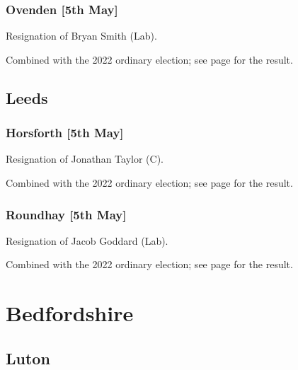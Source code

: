 \documentclass[a4paper,openany]{book}
\begin{document}
\begin{resultsiii}
\subsubsection*{Ovenden \hspace*{\fill}\nolinebreak[1]%
	\enspace\hspace*{\fill}
	[5th May]}


Resignation of Bryan Smith (Lab).

Combined with the 2022 ordinary election; see page \pageref{CalderdaleOvenden} for the result.

\subsection*{Leeds}

\subsubsection*{Horsforth \hspace*{\fill}\nolinebreak[1]%
	\enspace\hspace*{\fill}
	[5th May]}


Resignation of Jonathan Taylor (C).

Combined with the 2022 ordinary election; see page \pageref{LeedsHorsforth} for the result.

\subsubsection*{Roundhay \hspace*{\fill}\nolinebreak[1]%
	\enspace\hspace*{\fill}
	[5th May]}


Resignation of Jacob Goddard (Lab).

Combined with the 2022 ordinary election; see page \pageref{LeedsRoundhay} for the result.

\section{Bedfordshire}

\subsection*{Luton}


\end{resultsiii}
\end{document}
